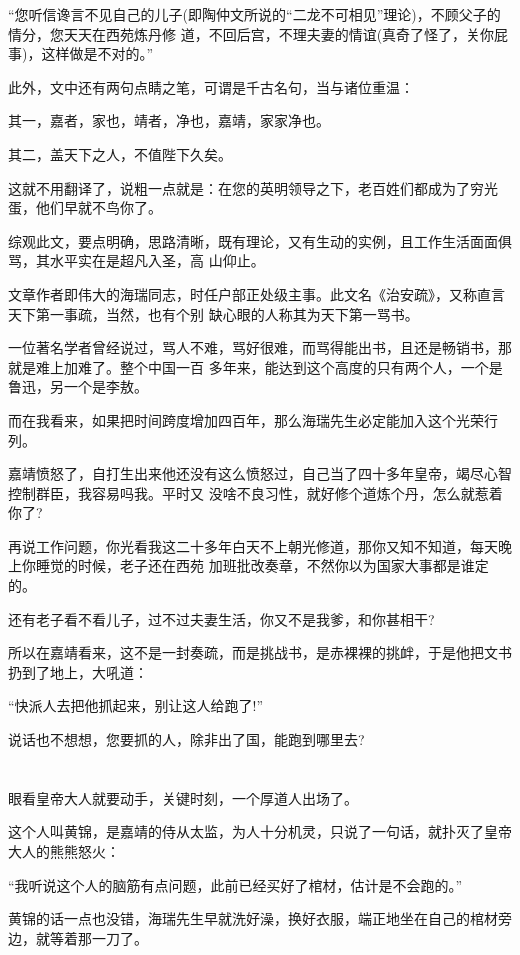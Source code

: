 \documentclass[11pt,a4paper,onecolumn]{article}
\begin{document}
``您听信谗言不见自己的儿子(即陶仲文所说的``二龙不可相见''理论)，不顾父子的情分，您天天在西苑炼丹修
道，不回后宫，不理夫妻的情谊(真奇了怪了，关你屁事)，这样做是不对的。''

此外，文中还有两句点睛之笔，可谓是千古名句，当与诸位重温：

其一，嘉者，家也，靖者，净也，嘉靖，家家净也。

其二，盖天下之人，不值陛下久矣。

这就不用翻译了，说粗一点就是：在您的英明领导之下，老百姓们都成为了穷光蛋，他们早就不鸟你了。

综观此文，要点明确，思路清晰，既有理论，又有生动的实例，且工作生活面面俱骂，其水平实在是超凡入圣，高
山仰止。

文章作者即伟大的海瑞同志，时任户部正处级主事。此文名《治安疏》，又称直言天下第一事疏，当然，也有个别
缺心眼的人称其为天下第一骂书。

一位著名学者曾经说过，骂人不难，骂好很难，而骂得能出书，且还是畅销书，那就是难上加难了。整个中国一百
多年来，能达到这个高度的只有两个人，一个是鲁迅，另一个是李敖。

而在我看来，如果把时间跨度增加四百年，那么海瑞先生必定能加入这个光荣行列。

嘉靖愤怒了，自打生出来他还没有这么愤怒过，自己当了四十多年皇帝，竭尽心智控制群臣，我容易吗我。平时又
没啥不良习性，就好修个道炼个丹，怎么就惹着你了?

再说工作问题，你光看我这二十多年白天不上朝光修道，那你又知不知道，每天晚上你睡觉的时候，老子还在西苑
加班批改奏章，不然你以为国家大事都是谁定的。

还有老子看不看儿子，过不过夫妻生活，你又不是我爹，和你甚相干?

所以在嘉靖看来，这不是一封奏疏，而是挑战书，是赤裸裸的挑衅，于是他把文书扔到了地上，大吼道：

``快派人去把他抓起来，别让这人给跑了!''

说话也不想想，您要抓的人，除非出了国，能跑到哪里去?

\section[\thesection]{}

眼看皇帝大人就要动手，关键时刻，一个厚道人出场了。

这个人叫黄锦，是嘉靖的侍从太监，为人十分机灵，只说了一句话，就扑灭了皇帝大人的熊熊怒火：

``我听说这个人的脑筋有点问题，此前已经买好了棺材，估计是不会跑的。''

黄锦的话一点也没错，海瑞先生早就洗好澡，换好衣服，端正地坐在自己的棺材旁边，就等着那一刀了。
\end{document}
